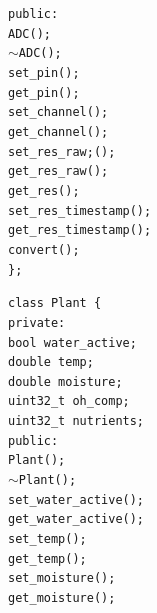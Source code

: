 \begin{flushleft}
\begin{flushleft}
        \quad\texttt{public:} \\
        \quad\quad\texttt{ADC();} \\
        \quad\quad\texttt{$\sim$ADC();} \\
        \quad\quad\texttt{set\_pin();} \\
        \quad\quad\texttt{get\_pin();} \\
        \quad\quad\texttt{set\_channel();} \\
        \quad\quad\texttt{get\_channel();} \\
        \quad\quad\texttt{set\_res\_raw;();} \\
        \quad\quad\texttt{get\_res\_raw();} \\
        \quad\quad\texttt{get\_res();} \\
        \quad\quad\texttt{set\_res\_timestamp();} \\
        \quad\quad\texttt{get\_res\_timestamp();} \\
        \quad\quad\texttt{convert();} \\
        \texttt{\};} \\
    \end{flushleft}
    \begin{flushleft}
        \texttt{class Plant \{}  \\
        \quad\texttt{private:} \\
        \quad\quad\texttt{bool water\_active;} \\
        \quad\quad\texttt{double temp;} \\
        \quad\quad\texttt{double moisture;} \\
        \quad\quad\texttt{uint32\_t oh\_comp;} \\
        \quad\quad\texttt{uint32\_t nutrients;} \\
        \quad\texttt{public:} \\
        \quad\quad\texttt{Plant();} \\
        \quad\quad\texttt{$\sim$Plant();} \\
        \quad\quad\texttt{set\_water\_active();} \\
        \quad\quad\texttt{get\_water\_active();} \\
        \quad\quad\texttt{set\_temp();} \\
        \quad\quad\texttt{get\_temp();} \\
        \quad\quad\texttt{set\_moisture();} \\
        \quad\quad\texttt{get\_moisture();} \\

\end{flushleft}
\end{flushleft}
